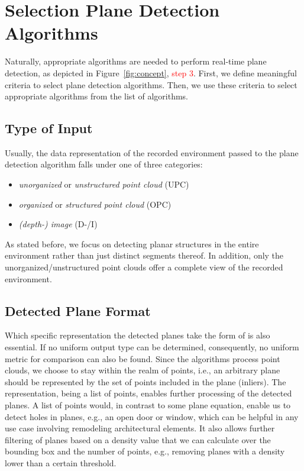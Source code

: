\documentclass[main.tex]{subfiles}
\begin{document}
\section{Selection Plane Detection Algorithms}
Naturally, appropriate algorithms are needed to perform real-time plane detection, as depicted in Figure~\ref{fig:concept}, \textcolor{red}{step 3}.
First, we define meaningful criteria to select plane detection algorithms. Then, we use these criteria to select appropriate algorithms from the list of algorithms.

\subsection*{Type of Input}
Usually, the data representation of the recorded environment passed to the plane detection algorithm falls under one of three categories:
\begin{itemize}
    \item \textit{unorganized} or \textit{unstructured point cloud} (UPC)
    \item \textit{organized} or \textit{structured point cloud} (OPC)
    \item \textit{(depth-) image} (D-/I)
\end{itemize}

As stated before, we focus on detecting planar structures in the entire environment rather than just distinct segments thereof.
In addition, only the unorganized/unstructured point clouds offer a complete view of the recorded environment.


\subsection*{Detected Plane Format}
Which specific representation the detected planes take the form of is also essential.
If no uniform output type can be determined, consequently, no uniform metric for comparison can also be found.
Since the algorithms process point clouds, we choose to stay within the realm of points, i.e., an arbitrary plane should be
represented by the set of points included in the plane (inliers).
The representation, being a list of points, enables further processing of the detected planes.
A list of points would, in contrast to some plane equation, enable us to detect holes in planes, e.g., 
an open door or window, which can be helpful in any use case involving remodeling architectural elements.
It also allows further filtering of planes based on a density value that we can calculate over the bounding 
box and the number of points, e.g., removing planes with a density lower than a certain threshold.
\end{document}
